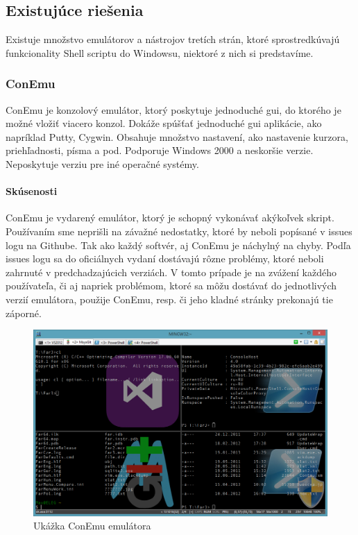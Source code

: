 \subsection{Existujúce riešenia}
\indent
Existuje množstvo emulátorov a nástrojov tretích strán, ktoré sprostredkúvajú funkcionality Shell scriptu do Windowsu, niektoré z nich si predstavíme.

\subsubsection{ConEmu}
\indent ConEmu je konzolový emulátor, ktorý poskytuje jednoduché \acrshort{gui}, do ktorého je možné vložiť viacero konzol. Dokáže spúšťať jednoduché \acrshort{gui} aplikácie, ako napríklad Putty, Cygwin. Obsahuje množstvo nastavení, ako nastavenie kurzora, priehľadnosti, písma a pod. Podporuje Windows 2000 a neskoršie verzie. Neposkytuje verziu pre iné operačné systémy. \cite{conemu}
\paragraph{Skúsenosti}
\indent ConEmu je vydarený emulátor, ktorý je schopný vykonávať akýkoľvek skript. Používaním sme neprišli na závažné nedostatky, ktoré by neboli popísané v issues logu na Githube. Tak ako každý softvér, aj ConEmu je náchylný na chyby. Podľa issues logu sa do oficiálnych vydaní dostávajú rôzne problémy, ktoré neboli zahrnuté v predchadzajúcich verziách. V tomto prípade je na zvážení každého používateľa, či aj napriek problémom, ktoré sa môžu dostávať do jednotlivých verzií emulátora, použije ConEmu, resp. či jeho kladné stránky prekonajú tie záporné.

\begin{figure}[!htbp]
	\centering
	\includegraphics[scale=0.3]{img/conEmuImg.jpg}
	\caption{Ukážka ConEmu emulátora}
	\label{fig:test}
\end{figure}
\newpage
